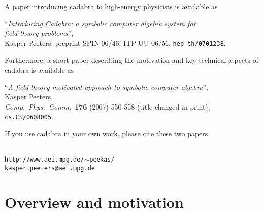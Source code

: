 \documentclass[11pt]{article}
\newcommand{\cdb}{{cadabra}\xspace}
\numberwithin{equation}{section}
\begin{document}
\noindent A paper introducing \cdb to high-energy physicists is
available as
\begin{center}
\begin{minipage}{.8\textwidth}
``\emph{Introducing Cadabra: a symbolic computer algebra system for\\
	 field theory problems}'',\\
Kasper Peeters,
preprint SPIN-06/46, ITP-UU-06/56, {\tt hep-th/0701238}.
\end{minipage}
\end{center}
Furthermore, a short paper describing the motivation and key technical
aspects of \cdb is available as
\begin{center}
\begin{minipage}{.8\textwidth}
``\emph{A field-theory motivated approach to symbolic computer algebra}'',\\
Kasper Peeters,\\
\emph{Comp.~Phys.~Comm.}~{\bf 176} (2007) 550-558 (title changed in print),\\
{\tt cs.CS/0608005}.\\
\end{minipage}
\end{center}
If you use \cdb in your own work, please cite these two papers.


\vfill
{}\\[3ex]
{\tt http://www.aei.mpg.de/$\sim$peekas/}\\[1ex]
{\tt kasper.peeters@aei.mpg.de}
\newpage

\pagestyle{empty}
\tableofcontents
\cleardoublepage
\pagestyle{fancy}

\section{Overview and motivation}
\end{document}
